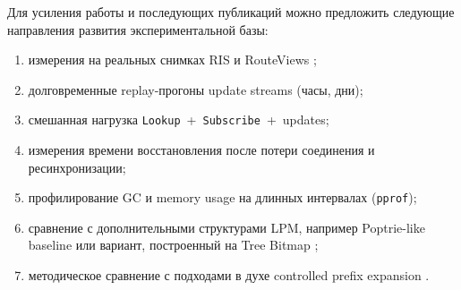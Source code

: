 Для усиления работы и последующих публикаций можно предложить
следующие направления развития экспериментальной базы:

\begin{enumerate}
\item измерения на реальных снимках RIS \cite{ripe-ris} и RouteViews
\cite{routeviews};
\item долговременные replay-прогоны update streams (часы, дни);
\item смешанная нагрузка \texttt{Lookup}~+~\texttt{Subscribe}~+~updates;
\item измерения времени восстановления после потери соединения и
ресинхронизации;
\item профилирование GC и memory usage на длинных интервалах
(\texttt{pprof});
\item сравнение с дополнительными структурами LPM, например
Poptrie-like baseline \cite{asai2015poptrie} или вариант,
построенный на Tree Bitmap \cite{eatherton2004treebitmap};
\item методическое сравнение с подходами в духе controlled prefix
expansion \cite{srinivasan1999prefixexpansion}.
\end{enumerate}

